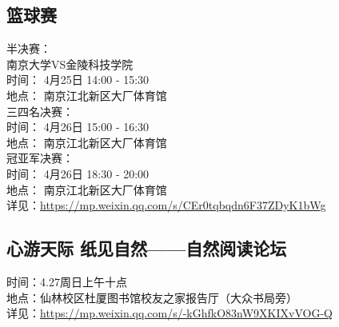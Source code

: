 \documentclass[letterpaper, 12pt]{article}
\begin{document}
\begin{multicols}{2}
\subsection{篮球赛} %
半决赛：
\\南京大学VS金陵科技学院
\\时间： 4月25日 14:00 - 15:30
\\地点： 南京江北新区大厂体育馆
\\三四名决赛：
\\时间： 4月26日 15:00 - 16:30
\\地点： 南京江北新区大厂体育馆
\\冠亚军决赛：
\\时间： 4月26日 18:30 - 20:00
\\地点： 南京江北新区大厂体育馆
\\详见：\url{https://mp.weixin.qq.com/s/CEr0tqbqdn6F37ZDyK1bWg}

\subsection{心游天际 纸见自然——自然阅读论坛} %
时间：4.27周日上午十点
\\地点：仙林校区杜厦图书馆校友之家报告厅（大众书局旁）
\\详见：\url{https://mp.weixin.qq.com/s/-kGhfkO83nW9XKIXvVOG-Q}
\end{multicols}
\end{document}
